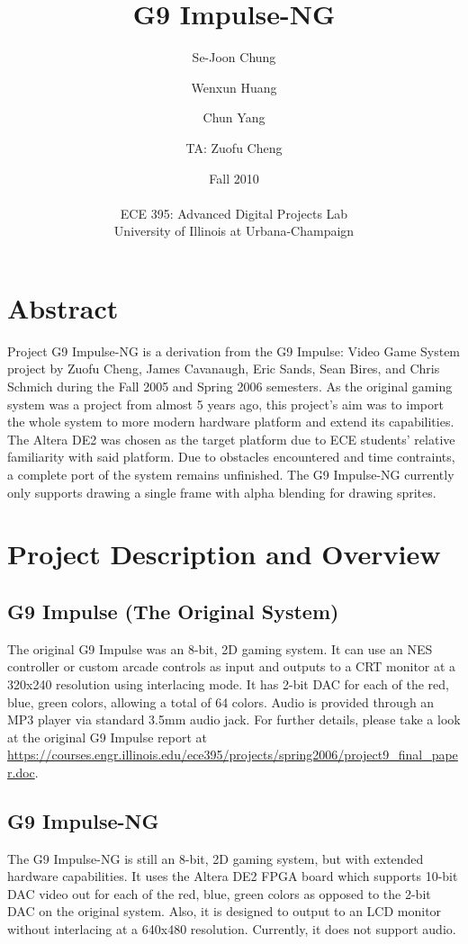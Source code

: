 \documentclass{report}
\title{G9 Impulse-NG}
\author{Se-Joon Chung \and Wenxun Huang \and Chun Yang \and TA: Zuofu Cheng}
\date{Fall 2010 \\ \hfill \\ ECE 395: Advanced Digital Projects Lab \\ University of Illinois at Urbana-Champaign}
\begin{document}
\maketitle
\newpage

\section*{Abstract}
Project G9 Impulse-NG is a derivation from the G9 Impulse: Video Game 
System project by Zuofu Cheng, James Cavanaugh, Eric Sands, Sean Bires, 
and Chris Schmich during the Fall 2005 and Spring 2006 semesters. As 
the original gaming system was a project from almost 5 years ago, this 
project's aim was to import the whole system to more modern hardware 
platform and extend its capabilities. The Altera DE2 was chosen as the
target platform due to ECE students' relative familiarity with said
platform. Due to obstacles encountered and time contraints, a complete
port of the system remains unfinished. The G9 Impulse-NG currently
only supports drawing a single frame with alpha blending for drawing
sprites.

\tableofcontents
\newpage

\section{Project Description and Overview}
\subsection{G9 Impulse (The Original System)}
The original G9 Impulse was an 8-bit, 2D gaming system. It can use an NES 
controller or custom arcade controls as input and outputs to a CRT
monitor at a 320x240 resolution using interlacing 
mode. It has 2-bit DAC for each of the red, blue, green colors, 
allowing a total of 64 colors. Audio is provided through an MP3 player 
via standard 3.5mm audio jack. For further details, please take a look 
at the original G9 Impulse report at 
\url{https://courses.engr.illinois.edu/ece395/projects/spring2006/project9\_final\_paper.doc}.

\subsection{G9 Impulse-NG}
The G9 Impulse-NG is still an 8-bit, 2D gaming system, but with extended 
hardware capabilities. It uses the Altera DE2 FPGA board which supports 
10-bit DAC video out for each of the red, blue, green colors as opposed 
to the 2-bit DAC on the original system. Also, it is designed to output 
to an LCD monitor without interlacing at a 640x480 resolution. Currently, it does 
not support audio.
\end{document}
